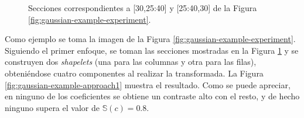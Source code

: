\begin{figure}
	\centering
	\caption{ Secciones correspondientes a [30,25:40] y [25:40,30] de la Figura \ref{fig:gaussian-example-experiment}.} \label{fig:lines-experiment}
\end{figure}

Como ejemplo se toma la imagen de la Figura \ref{fig:gaussian-example-experiment}. Siguiendo el primer enfoque,
se toman las secciones mostradas en la Figura
\ref{fig:lines-experiment} y se construyen dos \textit{shapelets} (una para las columnas y otra para las filas), obteniéndose cuatro componentes
al realizar la transformada. La Figura \ref{fig:gaussian-example-approach1} muestra el resultado. Como se puede apreciar, en ninguno de 
los coeficientes se obtiene un contraste alto con el resto, y de hecho ninguno supera el valor de $\mathbb{S}(c)=0.8$.

